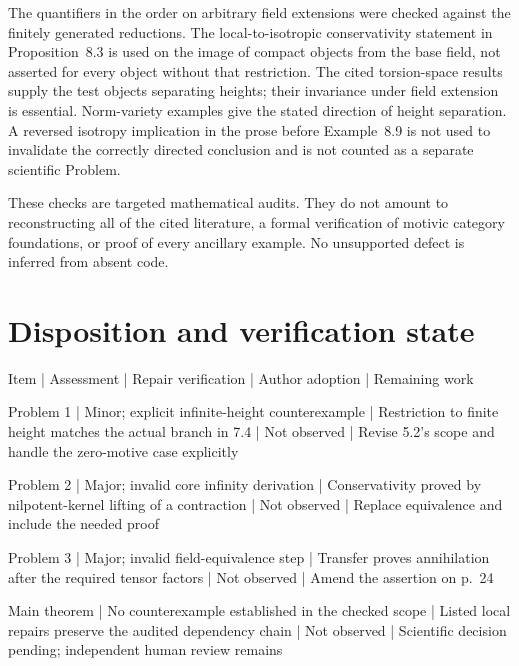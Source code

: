 \documentclass[10pt]{article}
\begin{document}
The quantifiers in the order on arbitrary field extensions were checked against the finitely generated reductions. The local-to-isotropic conservativity statement in Proposition 8.3 is used on the image of compact objects from the base field, not asserted for every object without that restriction. The cited torsion-space results supply the test objects separating heights; their invariance under field extension is essential. Norm-variety examples give the stated direction of height separation. A reversed isotropy implication in the prose before Example 8.9 is not used to invalidate the correctly directed conclusion and is not counted as a separate scientific Problem.\par
These checks are targeted mathematical audits. They do not amount to reconstructing all of the cited literature, a formal verification of motivic category foundations, or proof of every ancillary example. No unsupported defect is inferred from absent code.\par
\section*{Disposition and verification state}
Item | Assessment | Repair verification | Author adoption | Remaining work\par
Problem 1 | Minor; explicit infinite-height counterexample | Restriction to finite height matches the actual branch in 7.4 | Not observed | Revise 5.2’s scope and handle the zero-motive case explicitly\par
Problem 2 | Major; invalid core infinity derivation | Conservativity proved by nilpotent-kernel lifting of a contraction | Not observed | Replace equivalence and include the needed proof\par
Problem 3 | Major; invalid field-equivalence step | Transfer proves annihilation after the required tensor factors | Not observed | Amend the assertion on p. 24\par
Main theorem | No counterexample established in the checked scope | Listed local repairs preserve the audited dependency chain | Not observed | Scientific decision pending; independent human review remains\par
\end{document}
